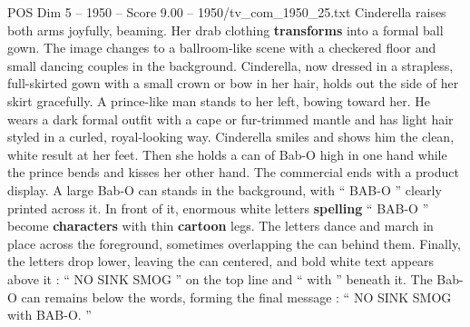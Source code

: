 \begin{textsample}{POS Dim 5 – 1950 – Score 9.00 – 1950/tv\_com\_1950\_25.txt}
Cinderella raises both arms joyfully, beaming.
Her drab clothing \textbf{transforms} into a formal ball gown.
The image changes to a ballroom-like scene with a checkered floor and small dancing couples in the background.
Cinderella, now dressed in a strapless, full-skirted gown with a small crown or bow in her hair, holds out the side of her skirt gracefully.
A prince-like man stands to her left, bowing toward her.
He wears a dark formal outfit with a cape or fur-trimmed mantle and has light hair styled in a curled, royal-looking way.
Cinderella smiles and shows him the clean, white result at her feet.
Then she holds a can of Bab-O high in one hand while the prince bends and kisses her other hand.
The commercial ends with a product display.
A large Bab-O can stands in the background, with “ BAB-O ” clearly printed across it.
In front of it, enormous white letters \textbf{spelling} “ BAB-O ” become \textbf{characters} with thin \textbf{cartoon} legs.
The letters dance and march in place across the foreground, sometimes overlapping the can behind them.
Finally, the letters drop lower, leaving the can centered, and bold white text appears above it : “ NO SINK SMOG ” on the top line and “ with ” beneath it.
The Bab-O can remains below the words, forming the final message : “ NO SINK SMOG with BAB-O. ”

\end{textsample}
